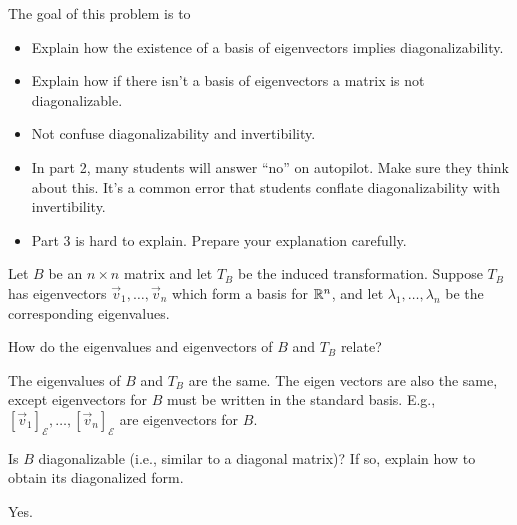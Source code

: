 \documentclass{workbook}
\newcommand{\bookonlynewpage}{\begin{bookonly}\newpage\end{bookonly}}
\begin{document}
\begin{slide}

	\bookonlynewpage
	\question
	\begin{annotation}
		\begin{goals}

			The goal of this problem is to
			\begin{itemize}
				\item Explain how the existence of a basis of eigenvectors implies diagonalizability.
				\item Explain how if there isn't a basis of eigenvectors a matrix is not diagonalizable.
				\item Not confuse diagonalizability and invertibility.
			\end{itemize}
		\end{goals}

		\begin{notes}
			\begin{itemize}
				\item In part 2, many students will answer ``no'' on autopilot. Make
					sure they think about this. It's a common error that students
					conflate diagonalizability with invertibility.
				\item Part 3 is hard to explain. Prepare your explanation carefully.
			\end{itemize}
		\end{notes}
	\end{annotation}
	Let $B$ be an $n\times n$ matrix and let $T_B$ be the induced transformation.
	Suppose $T_B$ has eigenvectors $\vec v_1,\ldots, \vec v_n$ which
	form a basis for $\mathbb{R}^n$, and let $\lambda_1,\ldots,\lambda_n$ be the corresponding
	eigenvalues.


	\begin{parts}
		\item How do the eigenvalues and eigenvectors of $B$ and $T_B$ relate?
		\begin{solution}
			The eigenvalues of $B$ and $T_B$ are the same. The eigen vectors
			are also the same, except eigenvectors for $B$ must be written
			in the standard basis. E.g., $[\vec v_1]_{\mathcal E},\ldots,[\vec v_n]_{\mathcal E}$
			are eigenvectors for $B$.
		\end{solution}
		\item Is $B$ diagonalizable (i.e., similar to a diagonal matrix)?  If so, explain how to obtain its diagonalized form.
		\begin{solution}
			Yes.


\end{solution}
\end{parts}
\end{slide}
\end{document}
